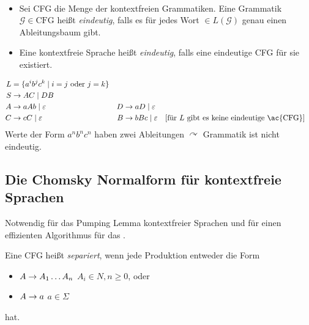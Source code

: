 {\begin{Def}[name={[Eindeutigkeit von \acs*{CFG} und \acs*{CFL}]}]\
	\begin{itemize}
	\item Sei CFG die Menge der kontextfreien Grammatiken.
    Eine Grammatik $\mathcal{G}\in \text{CFG}$ heißt \emph{eindeutig}, falls es für jedes Wort $\in L(\mathcal{G})$ genau einen Ableitungsbaum gibt.
	\item Eine kontextfreie Sprache heißt \emph{eindeutig}, falls eine eindeutige \ac{CFG} für sie existiert.
	\end{itemize}
\end{Def}
\begin{Bsp}
	\begin{align*}
		L &= \{ a^ib^jc^k \mid i=j\text{ oder }j=k \}\\
		S &\-> AC \mid DB\\
		A &\-> aAb \mid \Eps & D &\->aD \mid \Eps\\
		C &\->cC \mid \Eps & B &\-> bBc \mid \Eps \quad[\text{für $L$ gibt es keine eindeutige \ac{CFG}}]
	\end{align*}
	Werte der Form $a^nb^nc^n$ haben zwei Ableitungen $\curvearrowright$ Grammatik ist nicht eindeutig.
\end{Bsp}

\subsection{Die Chomsky Normalform für kontextfreie Sprachen}
Notwendig für das Pumping Lemma kontextfreier Sprachen und für einen effizienten Algorithmus für das .


\begin{Def}
  Eine CFG heißt \emph{separiert}, wenn jede Produktion entweder die Form
  \begin{itemize}
  \item $A\-> A_1\dots A_n$ \qquad $A_i\in N,n\geq 0$, oder
  \item $A \-> a$ \quad $a\in\Sigma$
  \end{itemize}
  hat.
\end{Def}

}
